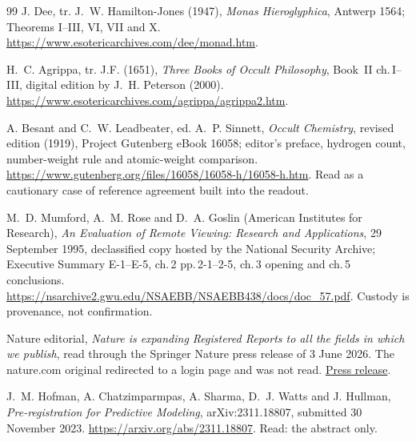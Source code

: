 \begin{thebibliography}{99}
J. Dee, tr. J.~W. Hamilton-Jones (1947), \emph{Monas Hieroglyphica},
Antwerp 1564; Theorems I--III, VI, VII and X.
\url{https://www.esotericarchives.com/dee/monad.htm}.

H.~C. Agrippa, tr. J.F. (1651), \emph{Three Books of Occult Philosophy},
Book~II ch.\,I--III, digital edition by J.~H. Peterson (2000).
\url{https://www.esotericarchives.com/agrippa/agrippa2.htm}.

A. Besant and C.~W. Leadbeater, ed. A.~P. Sinnett, \emph{Occult Chemistry},
revised edition (1919), Project Gutenberg eBook 16058; editor's preface,
hydrogen count, number-weight rule and atomic-weight comparison.
\url{https://www.gutenberg.org/files/16058/16058-h/16058-h.htm}.
Read as a cautionary case of reference agreement built into the readout.

M.~D. Mumford, A.~M. Rose and D.~A. Goslin (American Institutes for
Research), \emph{An Evaluation of Remote Viewing: Research and Applications},
29 September 1995, declassified copy hosted by the National Security Archive;
Executive Summary E-1--E-5, ch.\,2 pp.\,2-1--2-5, ch.\,3 opening and ch.\,5
conclusions.
\url{https://nsarchive2.gwu.edu/NSAEBB/NSAEBB438/docs/doc_57.pdf}.
Custody is provenance, not confirmation.

Nature editorial, \emph{Nature is expanding Registered Reports to all the
fields in which we publish}, read through the Springer Nature press release
of 3 June 2026. The nature.com original redirected to a login page and was
not read.
\href{https://group.springernature.com/gp/group/media/press-releases/nature-expands-registered-reports/52506282}{Press
release}.

J.~M. Hofman, A. Chatzimparmpas, A. Sharma, D.~J. Watts and J. Hullman,
\emph{Pre-registration for Predictive Modeling}, arXiv:2311.18807,
submitted 30 November 2023.
\url{https://arxiv.org/abs/2311.18807}.
Read: the abstract only.
\end{thebibliography}
